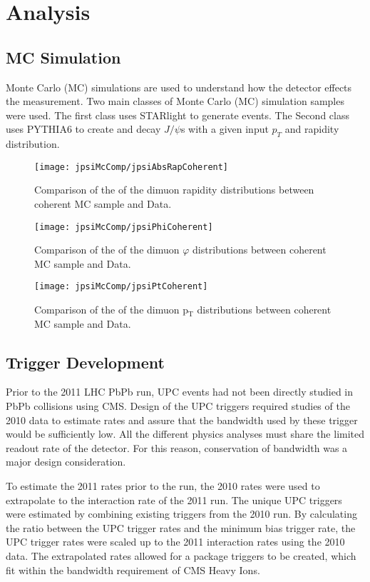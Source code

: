 \chapter{Analysis}	
  \section{\label{sec:mcSim} MC Simulation}
    Monte Carlo (MC) simulations are used to understand how the detector 
      effects the measurement.
    Two main classes of Monte Carlo (MC) simulation samples were used. 
    The first class uses STARlight to generate events. 
    The Second class uses PYTHIA6 to create and decay $J/\psi$s with a given
      input $p_{T}$ and rapidity distribution. 
    \begin{figure}[h]
      \centering
      \texttt{[image: jpsiMcComp/jpsiAbsRapCoherent]}
      \caption{Comparison of the of the dimuon rapidity distributions between 
        coherent MC sample and Data.}
      \label{fig:jpsiAbsRapCoherent}
    \end{figure}
    \begin{figure}[h]
      \centering
      \texttt{[image: jpsiMcComp/jpsiPhiCoherent]}
      \caption{Comparison of the of the dimuon $\varphi$ distributions 
        between coherent MC sample and Data.}
      \label{fig:jpsiPhiCoherent}
    \end{figure}
    \begin{figure}[h]
      \centering
      \texttt{[image: jpsiMcComp/jpsiPtCoherent]}
      \caption{Comparison of the of the dimuon p$_{\textrm{T}}$ distributions 
        between coherent MC sample and Data.}
      \label{fig:jpsiPtCoherent}
    \end{figure}

  \section{\label{sec:TrigDev} Trigger Development} 
    Prior to the 2011 LHC PbPb run, UPC events had not been directly studied in 
      PbPb collisions using CMS. 
    Design of the UPC triggers required studies of the 2010 data to estimate 
      rates and assure that the bandwidth used by these trigger would be
      sufficiently low. 
    All the different physics analyses must share the limited readout rate of 
      the detector.
    For this reason, conservation of bandwidth was a major design consideration.

    To estimate the 2011 rates prior to the run, the 2010 rates were used to 
      extrapolate to the interaction rate of the 2011 run. 
    The unique UPC triggers were estimated by combining existing triggers from
      the 2010 run. 
    By calculating the ratio between the UPC trigger rates and the minimum bias
      trigger rate, the UPC trigger rates were scaled up to the 2011 
      interaction rates using the 2010 data. 
    The extrapolated rates allowed for a package triggers to be created, which 
      fit within the bandwidth requirement of CMS Heavy Ions. 
    
